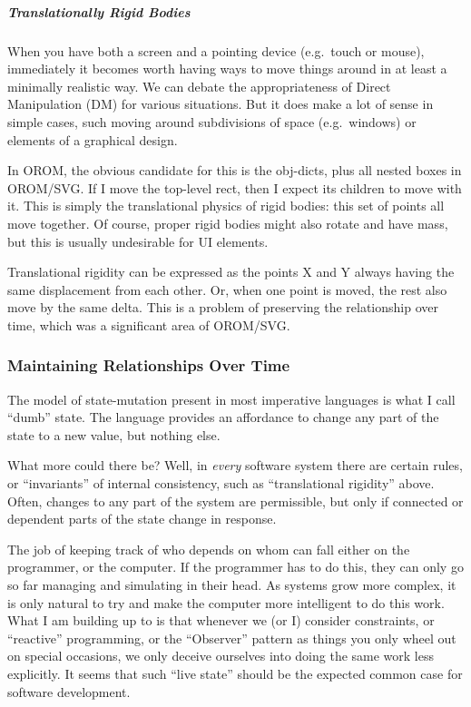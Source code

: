 \documentclass[english,submission]{programming}
\begin{document}
  \hypertarget{translationally-rigid-bodies}{%
  \subparagraph{Translationally Rigid
  Bodies}\label{translationally-rigid-bodies}}

  When you have both a screen and a pointing device (e.g.~touch or mouse),
  immediately it becomes worth having ways to move things around in at
  least a minimally realistic way. We can debate the appropriateness of
  Direct Manipulation (DM) for various situations. But it does make a lot
  of sense in simple cases, such moving around subdivisions of space
  (e.g.~windows) or elements of a graphical design.

  In OROM, the obvious candidate for this is the obj-dicts, plus all
  nested boxes in OROM/SVG. If I move the top-level rect, then I expect
  its children to move with it. This is simply the translational physics
  of rigid bodies: this set of points all move together. Of course, proper
  rigid bodies might also rotate and have mass, but this is usually
  undesirable for UI elements.

  Translational rigidity can be expressed as the points X and Y always
  having the same displacement from each other. Or, when one point is
  moved, the rest also move by the same delta. This is a problem of
  preserving the relationship over time, which was a significant area of
  OROM/SVG.

  \hypertarget{maintaining-relationships-over-time}{%
  \subsubsection{Maintaining Relationships Over
  Time}\label{maintaining-relationships-over-time}}

  The model of state-mutation present in most imperative languages is what
  I call ``dumb'' state. The language provides an affordance to change any
  part of the state to a new value, but nothing else.

  What more could there be? Well, in \emph{every} software system there
  are certain rules, or ``invariants'' of internal consistency, such as
  ``translational rigidity'' above. Often, changes to any part of the
  system are permissible, but only if connected or dependent parts of the
  state change in response.

  The job of keeping track of who depends on whom can fall either on the
  programmer, or the computer. If the programmer has to do this, they can
  only go so far managing and simulating in their head. As systems grow
  more complex, it is only natural to try and make the computer more
  intelligent to do this work. What I am building up to is that whenever
  we (or I) consider constraints, or ``reactive'' programming, or the
  ``Observer'' pattern as things you only wheel out on special occasions,
  we only deceive ourselves into doing the same work less explicitly. It
  seems that such ``live state'' should be the expected common case for
  software development.
\end{document}
